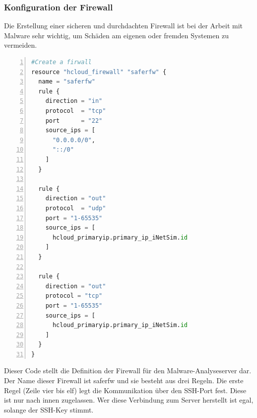 \begin{otherlanguage}{ngerman}
\subsubsection{Konfiguration der Firewall}
Die Erstellung einer sicheren und durchdachten Firewall ist bei der Arbeit mit Malware sehr wichtig, um Schäden am eigenen oder fremden Systemen zu vermeiden. 
\newline
\newline
\tt
\begin{lstlisting}[caption = Konfiguration der Firewall für den Analyseserver, language=python, numbers=left, numberstyle=\tiny]
#Create a firwall
resource "hcloud_firewall" "saferfw" {
  name = "saferfw"
  rule {
    direction = "in"
    protocol  = "tcp"
    port      = "22"
    source_ips = [
      "0.0.0.0/0",
      "::/0"
    ]
  }

  rule {
    direction = "out"
    protocol  = "udp"
    port = "1-65535"
    source_ips = [
      hcloud_primaryip.primary_ip_iNetSim.id
    ]
  }

  rule {
    direction = "out"
    protocol = "tcp"
    port = "1-65535"
    source_ips = [
      hcloud_primaryip.primary_ip_iNetSim.id
    ]
  }
}
\end{lstlisting}
\rm
Dieser Code stellt die Definition der Firewall für den Malware-Analyseserver dar. Der Name dieser Firewall ist \dq saferfw \dq{} und sie besteht aus drei Regeln. Die erste Regel (Zeile vier bis elf) legt die Kommunikation über den SSH-Port fest. Diese ist nur nach innen zugelassen. Wer diese Verbindung zum Server herstellt ist egal, solange der SSH-Key stimmt. 
\newline

\end{otherlanguage}